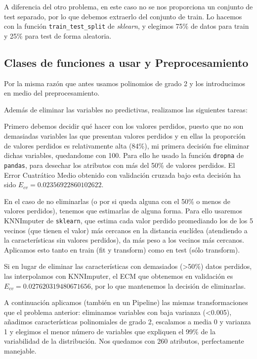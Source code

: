 \documentclass[a4]{article}
\begin{document}
A diferencia del otro problema, en este caso no se nos proporciona un
conjunto de test separado, por lo que debemos extraerlo del conjunto
de train. Lo hacemos con la función \texttt{train\_test\_split} de
\textit{sklearn}, y elegimos 75\% de datos para train y 25\% para test
de forma aleatoria.

\subsection{Clases de funciones a usar y Preprocesamiento}

Por la misma razón que antes usamos polinomios de grado 2 y los
introducimos en medio del preprocesamiento.

Además de eliminar las variables no predictivas, realizamos las
siguientes tareas:

Primero debemos decidir qué hacer con los valores perdidos, puesto que
no son demasiadas variables las que presentan valores perdidos y en
ellas la proporción de valores perdidos es relativamente alta (84\%),
mi primera decisión fue eliminar dichas variables, quedandome con 100.
Para ello he usado la función \texttt{dropna} de \texttt{pandas}, para
desechar los atributos con más del 50\% de valores perdidos. El Error
Cuatrático Medio obtenido con validación cruzada bajo esta decisión ha
sido $E_{cv} = 0.02356922860102622$.

En el caso de no eliminarlas (o por si queda alguna con el 50\% o
menos de valores perdidos), tenemos que estimarlas de alguna
forma. Para ello usaremos KNNImputer de \texttt{sklearn}, que estima
cada valor perdido promediando los de los 5 vecinos (que tienen el
valor) más cercanos en la distancia euclídea (atendiendo a la
características sin valores perdidos), da más peso a los vecinos más
cercanos. Aplicamos esto tanto en train (fit y transform) como en test
(sólo transform).

Si en lugar de eliminar las características con demasiados (>50\%)
datos perdidos, las interpolamos con KNNImputer, el ECM que obtenemos
en validación es $E_{cv} = 0.027620319480671656$, por lo que
mantenemos la decisión de eliminarlas.

A continuación aplicamos (también en un Pipeline) las mismas
transformaciones que el problema anterior: eliminamos variables con
baja varianza (<0.005), añadimos características polinomiales de grado
2, escalamos a media 0 y varianza 1 y elegimos el menor número de
variables que expliquen el 99\% de la variabilidad de la distribución.
Nos quedamos con 260 atributos, perfectamente manejable.
\end{document}
